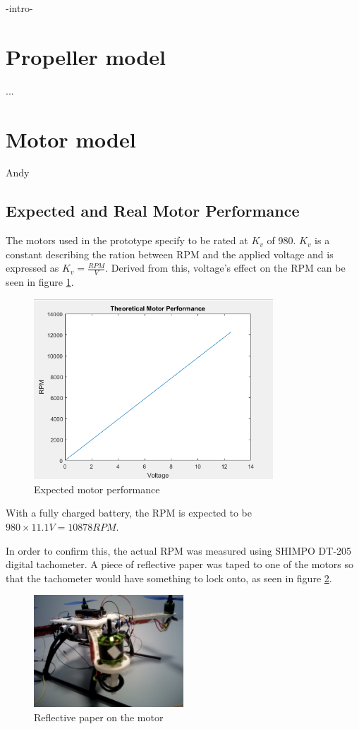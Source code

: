 -intro-

\section{Propeller model}

...

\section{Motor model}

Andy

\subsection{Expected and Real Motor Performance}
The motors used in the prototype specify to be rated at $K_v$ of 980. $K_v$ is a constant describing the ration between RPM and the applied voltage and is expressed as $K_v = \frac{RPM}{V}$. Derived from this, voltage's effect on the RPM can be seen in figure \ref{KvPlot}.
\begin{figure}[H]
  \centering
    \includegraphics[width=0.8\textwidth]{images/KvPlot.png}
	\caption{Expected motor performance}
	\label{KvPlot}
\end{figure}
With a fully charged battery, the RPM is expected to be $980\times 11.1V = 10878 RPM$.

In order to confirm this, the actual RPM was measured using SHIMPO DT-205 digital tachometer. A piece of reflective paper was taped to one of the motors so that the tachometer would have something to lock onto, as seen in figure \ref{tachometer}.

\begin{figure}[H]
  \centering
    \includegraphics[width=0.5\textwidth]{images/tachometer.jpg}
	\caption{Reflective paper on the motor}
	\label{tachometer}
\end{figure}

